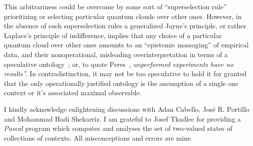 \documentclass[%
  reprint,
  twocolumn,
 showpacs,
 showkeys,
 preprintnumbers,
 amsmath,amssymb,
 aps,
  prl,
  longbibliography,
 ]{revtex4-1}
\begin{document}
This arbitrariness could be overcome by some sort of ``superselection rule''
prioritizing or selecting particular quantum clouds over other ones.
However, in the absence of such superselection rules a generalized Jayne's principle, or rather Laplace's principle of indifference,
implies that any choice of a particular quantum cloud over other ones
amounts to an ``epistemic massaging'' of empirical data, and their nonoperational,
misleading overinterpretation in terms of a speculative ontology~\cite{berkeley,stace,Goldschmidt2017-idealism};
or, to quote Peres~\cite{peres222}, {\em unperformed experiments have no results''.}
In contradistinction, it may not be too speculative to hold it for granted that the only operationally
justified ontology is the assumption of a single one context or it's associated maximal observable.

\begin{acknowledgments}
I kindly acknowledge enlightening discussions with Adan Cabello, Jos\'{e} R. Portillo and Mohammad Hadi Shekarriz.
I am grateful to Josef Tkadlec for providing a {\em Pascal} program
which computes and analyses the set of two-valued states of collections of contexts.
All misconceptions and errors are mine.
\end{acknowledgments}



\end{document}
